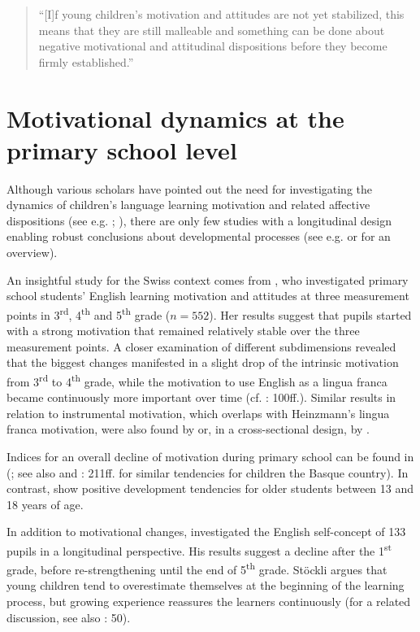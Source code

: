 \documentclass[output=paper]{langsci/langscibook}
\begin{document}
\begin{quote}
“[I]f young children’s motivation and attitudes are not yet stabilized, this means that they are still malleable and something can be done about negative motivational and attitudinal dispositions before they become firmly established.” \citep[4]{Heinzmann2013}
\end{quote}

\section{Motivational dynamics at the primary school level}

Although various scholars have pointed out the need for investigating the dynamics of children’s language learning motivation and related affective dispositions (see e.g. \citealt{Cenoz2004}; \citealt{McGroarty2001}), there are only few studies with a longitudinal design enabling robust conclusions about developmental processes (see e.g. \citealt{MihaljevicDjigunovic2012} or \citealt{MihaljevicDjigunovicNikolov2019} for an overview). 

An insightful study for the Swiss context comes from \citet{Heinzmann2013}, who investigated primary school students’ English learning motivation and attitudes at three measurement points in 3\textsuperscript{rd}, 4\textsuperscript{th} and 5\textsuperscript{th} grade ($n=552$). Her results suggest that pupils started with a strong motivation that remained relatively stable over the three measurement points. A closer examination of different subdimensions revealed that the biggest changes manifested in a slight drop of the intrinsic motivation from 3\textsuperscript{rd} to 4\textsuperscript{th} grade, while the motivation to use English as a lingua franca became continuously more important over time (cf. \citealt{Heinzmann2013}: 100ff.). Similar results in relation to instrumental motivation, which overlaps with Heinzmann’s lingua franca motivation, were also found by \citet{Nikolov2002} or, in a cross-sectional design, by \citet[256]{Tragant2006}.

Indices for an overall decline of motivation during primary school can be found in \citeauthor{BaderSchaer2005} (\citeyear{BaderSchaer2005}; see also \citealt{SchaerBader2003} and \citealt{Cenoz2004}: 211ff. for similar tendencies for children the Basque country). In contrast, \citet[324]{PfenningerSingleton2016} show positive development tendencies for older students between 13 and 18 years of age. 

In addition to motivational changes, \citet[93]{Stoeckli2004} investigated the English self-concept of 133 pupils in a longitudinal perspective. His results suggest a decline after the 1\textsuperscript{st} grade, before re-strengthening until the end of 5\textsuperscript{th} grade. Stöckli argues that young children tend to overestimate themselves at the beginning of the learning process, but growing experience reassures the learners continuously (for a related discussion, see also \citealt{MihaljevicDjigunovicLopriore2011}: 50).
\end{document}
